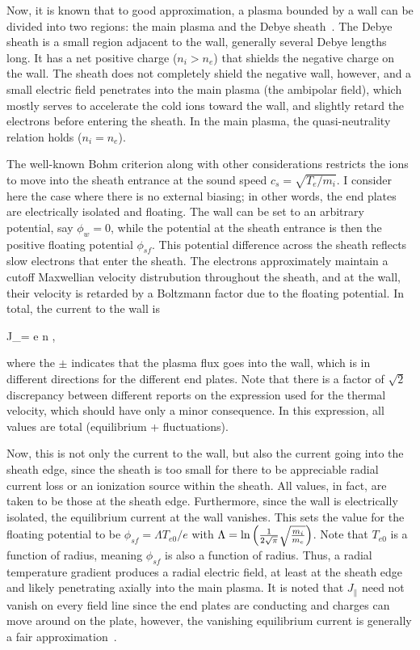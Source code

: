 Now, it is known that to good approximation, a plasma bounded by a wall can be divided into two regions: the main plasma and the Debye sheath~\cite{stangeby2000}. 
The Debye sheath is a small region adjacent to the wall, generally several Debye lengths long. It has a net positive charge ($n_i > n_e$) 
that shields the negative charge on the wall. The sheath does not completely shield the negative wall, however, and a small electric field penetrates into
the main plasma (the ambipolar field), which mostly serves to accelerate the cold ions toward the wall, and slightly retard the electrons before entering the sheath.
In the main plasma, the quasi-neutrality relation holds ($n_i = n_e$). 

The well-known Bohm criterion along with other considerations restricts the ions to move into the sheath entrance at the sound speed $c_s = \sqrt{T_e/m_i}$. 
I consider here the case where there is no external biasing; in other words, the end plates are electrically isolated and floating.
The wall can be set to an arbitrary potential, say $\phi_w = 0$, while the potential at the sheath entrance is then the positive 
floating potential $\phi_{sf}$. This potential difference across the sheath reflects slow electrons that enter the sheath.
The electrons approximately maintain a cutoff Maxwellian velocity distrubution throughout the sheath, and at the wall, 
their velocity is retarded by a Boltzmann factor due to the floating potential. 
In total, the current to the wall is~\cite{berk1991,berk1993,xu1993}

\beq
\label{sheath_current}
J_\parallel = \pm e n ,
\eeq

where the $\pm$ indicates that the plasma flux goes into the wall, which is in different directions for the different end plates.
Note that there is a factor of $\sqrt{2}$ discrepancy between different reports on the expression used for the thermal velocity, which should have only a minor consequence.
In this expression, all values are total (equilibrium + fluctuations).

Now, this is not only the current to the wall, but also the current going into the sheath edge, since the sheath is too small for there to be appreciable radial current loss or an ionization source
within the sheath. All values, in fact, are taken to be those at the sheath edge.
Furthermore, since the wall is electrically isolated, the equilibrium current at the wall vanishes.
This sets the value for the floating potential to be $\phi_{sf} = \Lambda T_{e0} / e$ with $\Lambda = {\rm ln} \left(\frac{1}{2 \sqrt{\pi}} \sqrt{\frac{m_i}{m_e}} \right)$.
Note that $T_{e0}$ is a function of radius, meaning $\phi_{sf}$ is also a function of radius. Thus, a radial temperature gradient produces a radial
electric field, at least at the sheath edge and likely penetrating axially into the main plasma. 
It is noted that $J_\parallel$ need not vanish on every field line since the end plates are conducting and charges can move around on the plate, 
however, the vanishing equilibrium current is generally a fair approximation~\cite{berk1993}.

